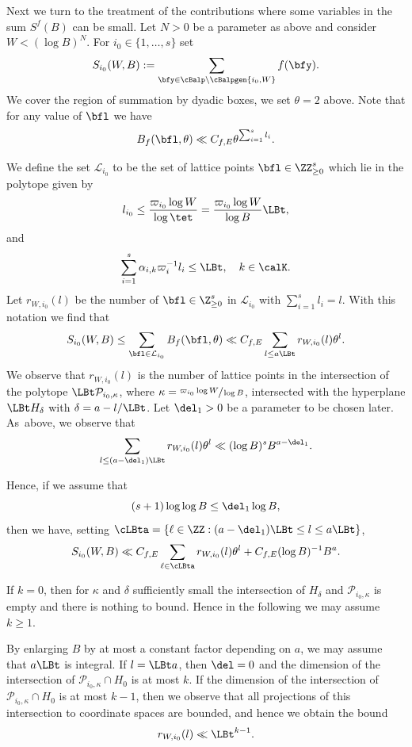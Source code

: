 Next we turn to the treatment of the contributions where some variables in the sum $S^f(B)$ can be small. Let $N>0$ be a parameter as above and consider $W< (\log B)^N$. For $i_0\in \{1,\ldots, s\}$ set
\[
S_{i_0}(W,B):= \sum_{\bfy\in\cBalp\setminus\cBalpgen{i_0,W}}f(\bfy).
\]
We cover the region of summation by dyadic boxes, \ie we set $\theta=2$ above. Note that for any value of $\bfl$ we have
\[
B_f(\bfl,\theta)\ll C_{f,E} \theta^{\sum_{i=1}^s l_i}.
\]

We define the set $\mathcal{L}_{i_0}$ to be the set of lattice points $\bfl\in\ZZ_{\geq 0}^s$ which lie in the polytope given by
\[
l_{i_0} \leq \frac{\varpi_{i_0} \log W}{\log \tet}= \frac{\varpi_{i_0}\log W}{\log B} \LBt,
\]
and
\begin{gather*}
\sum_{i=1}^s \alpha_{i,k} \varpi_i^{-1}l_i \leq \LBt,\quad k\in \calK.
\end{gather*}
Let $r_{W,i_0}(l)$ be the number of $\bfl\in \Z_{\geq 0}^s$ in $\mathcal{L}_{i_0}$ with $\sum_{i=1}^s l_i=l$. With this notation we find that
\[
S_{i_0}(W,B)\leq \sum_{\bfl\in \mathcal{L}_{i_0}}B_f(\bfl,\theta) \ll C_{f,E}\sum_{l\leq a \LBt} r_{W,i_0}(l) \theta^l.
\]
We observe that $r_{W,i_0}(l)$ is the number of lattice points in the intersection of the polytope $\LBt \mathcal{P}_{i_0,\kappa}$, where $\kappa= \sfrac{\varpi_{i_0}\log W}{\log B}$, intersected with the hyperplane $\LBt H_{\delta}$ with $\delta =a- l/{\LBt}$. Let $\del_1>0$ be a parameter to be chosen later. As~above, we observe that
\[
\sum_{l\leq (a-\del_1)\LBt} r_{W,i_0}(l) \theta^l \ll (\log B)^s B^{a-\del_1}.
\]

Hence, if we assume that
\begin{equation}\label{eqndel1}
(s+1) \log \log B \leq \del_1 \log B,
\end{equation}
then we have, setting $\cLBta=\{\ell\in\ZZ:(a-\del_1) \LBt \leq l\leq a \LBt\}$,
\[
S_{i_0}(W,B)\ll C_{f,E}\sum_{\ell\in\cLBta} r_{W,i_0}(l) \theta^l + C_{f,E} (\log B)^{-1} B^a.
\]

If $k=0$, then for $\kappa$ and $\delta$ sufficiently small the intersection of $H_\delta$ and $\mathcal{P}_{i_0,\kappa}$ is empty and there is nothing to bound. Hence in the following we may assume $k\geq 1$.\par
By enlarging $B$ by at most a constant factor depending on $a$, we may assume that $a\LBt$ is integral. If $l=\LBt a$, then $\del=0$ and the dimension of the intersection of $\mathcal{P}_{i_0,\kappa}\cap H_0$ is at most $k$. If the dimension of the intersection of $\mathcal{P}_{i_0,\kappa}\cap H_0$ is at most $k-1$, then we observe that all projections of this intersection to coordinate spaces are bounded, and hence we obtain the bound
\[
r_{W,i_0}(l)\ll \LBt^{k-1}.
\]

